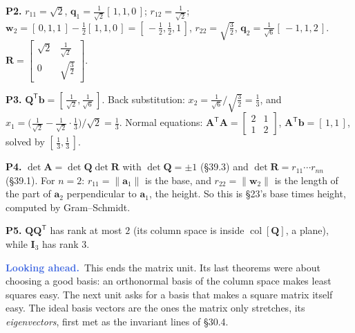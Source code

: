 \documentclass[11pt]{article}
\theoremstyle{plain}
\theoremstyle{definition}
\theoremstyle{remark}
\newcommand{\lookahead}{\par\smallskip\noindent
  \textbf{\sffamily\textcolor{RoyalBlue}{Looking ahead.}}\ \ignorespaces}
\newcommand{\vc}[1]{\mathbf{#1}}
\newcommand{\mt}[1]{\mathbf{#1}}
\newcommand{\norm}[1]{\lVert #1\rVert}
\newcommand{\T}{^{\mathsf{T}}}
\newcommand{\colsp}[1]{\operatorname{col}[#1]}
\begin{document}
\smallskip
\noindent\textbf{P2.} $r_{11}=\sqrt2$, $\vc{q}_1=\frac{1}{\sqrt2}[\,1,1,0\,]$;
$r_{12}=\frac{1}{\sqrt2}$; $\vc{w}_2=[\,0,1,1\,]-\frac12[\,1,1,0\,]=[\,-\frac12,\frac12,1\,]$,
$r_{22}=\sqrt{\frac32}$, $\vc{q}_2=\frac{1}{\sqrt6}[\,-1,1,2\,]$.
$\mt{R}=\begin{bmatrix}\sqrt2&\frac{1}{\sqrt2}\\[2pt]0&\sqrt{\frac32}\end{bmatrix}$.

\smallskip
\noindent\textbf{P3.} $\mt{Q}\T\vc{b}=[\,\frac{1}{\sqrt2},\frac{1}{\sqrt6}\,]$.
Back substitution: $x_2=\frac{1}{\sqrt6}\big/\sqrt{\frac32}=\frac13$, and
$x_1=\bigl(\frac{1}{\sqrt2}-\frac{1}{\sqrt2}\cdot\frac13\bigr)\big/\sqrt2=\frac13$.
Normal equations: $\mt{A}\T\mt{A}=\begin{bmatrix}2&1\\1&2\end{bmatrix}$,
$\mt{A}\T\vc{b}=[\,1,1\,]$, solved by $[\,\frac13,\frac13\,]$. \checkmark

\smallskip
\noindent\textbf{P4.} $\det\mt{A}=\det\mt{Q}\det\mt{R}$ with $\det\mt{Q}=\pm1$
(\S39.3) and $\det\mt{R}=r_{11}\cdots r_{nn}$ (\S39.1). For $n=2$:
$r_{11}=\norm{\vc{a}_1}$ is the base, and $r_{22}=\norm{\vc{w}_2}$ is the length of
the part of $\vc{a}_2$ perpendicular to $\vc{a}_1$, the height. So this is
\S23's base times height, computed by Gram--Schmidt.

\smallskip
\noindent\textbf{P5.} $\mt{Q}\mt{Q}\T$ has rank at most $2$ (its column space is
inside $\colsp{\mt{Q}}$, a plane), while $\mt{I}_3$ has rank $3$.

\lookahead This ends the matrix unit. Its last theorems were about choosing a good
basis: an orthonormal basis of the column space makes least squares easy. The next
unit asks for a basis that makes a square matrix itself easy. The ideal basis
vectors are the ones the matrix only stretches, its \emph{eigenvectors}, first met
as the invariant lines of \S30.4.
\end{document}
